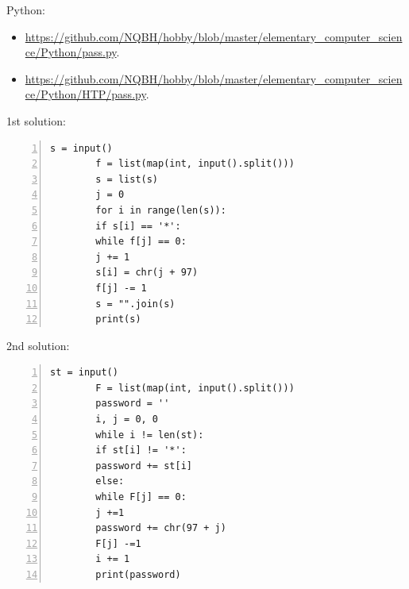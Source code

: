 \documentclass{article}
\begin{document}
Python:
\begin{itemize}
	\item \url{https://github.com/NQBH/hobby/blob/master/elementary_computer_science/Python/pass.py}.
	\item \url{https://github.com/NQBH/hobby/blob/master/elementary_computer_science/Python/HTP/pass.py}.
\end{itemize} 
\begin{multicols}{2}
	1st solution:
	\begin{Verbatim}[numbers=left,xleftmargin=5mm]
		s = input()
		f = list(map(int, input().split()))
		s = list(s)
		j = 0
		for i in range(len(s)):
		if s[i] == '*':
		while f[j] == 0:
		j += 1
		s[i] = chr(j + 97)
		f[j] -= 1
		s = "".join(s)
		print(s)
	\end{Verbatim}
	
	\columnbreak
	2nd solution:
	\begin{Verbatim}[numbers=left,xleftmargin=5mm]
		st = input()
		F = list(map(int, input().split()))
		password = ''
		i, j = 0, 0
		while i != len(st):
		if st[i] != '*':
		password += st[i]
		else:
		while F[j] == 0:
		j +=1
		password += chr(97 + j)
		F[j] -=1
		i += 1
		print(password)
	\end{Verbatim}
\end{multicols}
\end{document}
